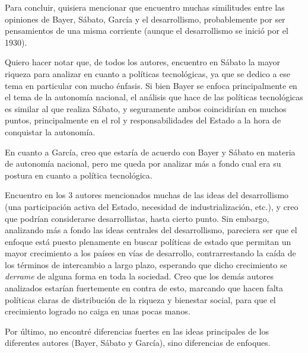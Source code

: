 Para concluir, quisiera mencionar que encuentro muchas similitudes entre las opiniones de Bayer, Sábato, García y el desarrollismo,
probablemente por ser pensamientos de una misma corriente (aunque el desarrollismo se inició por el 1930).

Quiero hacer notar que, de todos los autores, encuentro en Sábato la mayor riqueza para analizar en cuanto a políticas tecnológicas, ya que se dedico a ese tema en particular con mucho énfasis. Si bien Bayer se enfoca principalmente en el tema de la autonomía nacional, el análisis que hace de las políticas tecnológicas es similar al que realiza Sábato, y seguramente ambos coincidirían en muchos puntos, principalmente en el rol y responsabilidades del Estado a la hora de conquistar la autonomía.

En cuanto a García, creo que estaría de acuerdo con Bayer y Sábato en materia de autonomía nacional, pero me queda por analizar más a fondo cual era su postura en cuanto a política tecnológica.

Encuentro en los 3 autores mencionados muchas de las ideas del desarrollismo (una participación activa del Estado, necesidad de industrialización, etc.), y creo que podrían considerarse desarrollistas, hasta cierto punto.
Sin embargo, analizando más a fondo las ideas centrales del desarrollismo, pareciera ser que el enfoque está puesto plenamente en buscar políticas de estado que permitan un mayor crecimiento a los países en vías de desarrollo, contrarrestando la caída de los términos de intercambio a largo plazo, esperando que dicho crecimiento se \textit{derrame} de alguna forma en toda la sociedad. Creo que los demás autores analizados estarían fuertemente en contra de esto, marcando que hacen falta políticas claras de distribución de la riqueza y bienestar social, para que el crecimiento logrado no caiga en unas pocas manos.

Por último, no encontré diferencias fuertes en las ideas principales de los diferentes autores (Bayer, Sábato y García), sino diferencias de enfoques.
